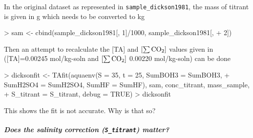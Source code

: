 \documentclass[article,nojss]{jss}
\begin{document}
\noindent
In the original dataset as represented in \texttt{sample\_dickson1981}, the mass of titrant is given in g which needs to be converted to kg
\begin{Schunk}
\begin{Sinput}
> sam <- cbind(sample_dickson1981[, 1]/1000, sample_dickson1981[, 
+     2])
\end{Sinput}
\end{Schunk}
Then an attempt to recalculate the [TA] and $\rm [\sum CO_2]$ values given in \cite{Dickson1981} ([TA]=0.00245 mol/kg-soln and $\rm [\sum CO_2]$ 0.00220 mol/kg-soln)
can be done
\begin{Schunk}
\begin{Sinput}
> dicksonfit <- TAfit(aquaenv(S = 35, t = 25, SumBOH3 = SumBOH3, 
+     SumH2SO4 = SumH2SO4, SumHF = SumHF), sam, conc_titrant, mass_sample, 
+     S_titrant = S_titrant, debug = TRUE)
> dicksonfit
\end{Sinput}
\end{Schunk}
This shows the fit is not accurate. Why is that so?

\subparagraph{Does the salinity correction (\texttt{S\_titrant}) matter?}$\;$\\
\end{document}

